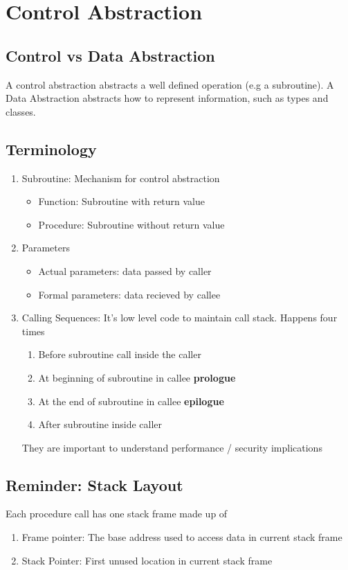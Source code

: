 \documentclass{article}
\begin{document}
\section{Control Abstraction}
\subsection{Control vs Data Abstraction}
A control abstraction abstracts a well defined operation (e.g a subroutine). A Data Abstraction abstracts how to represent information, such as types and classes.

\subsection{Terminology}
\begin{enumerate}
  \item Subroutine: Mechanism for control abstraction
  \begin{itemize}
    \item Function: Subroutine with return value
    \item Procedure: Subroutine without return value
  \end{itemize}
  \item Parameters
  \begin{itemize}
    \item Actual parameters: data passed by caller
    \item Formal parameters: data recieved by callee
  \end{itemize}
  \item Calling Sequences: It's low level code to maintain call stack. Happens four times
  \begin{enumerate}
    \item Before subroutine call inside the caller
    \item At beginning of subroutine in callee \textbf{prologue}
    \item At the end of subroutine in callee \textbf{epilogue}
    \item After subroutine inside caller
  \end{enumerate}
  They are important to understand performance / security implications
\end{enumerate}
\subsection{Reminder: Stack Layout}
Each procedure call has one stack frame made up of 
\begin{enumerate}
  \item Frame pointer: The base address used to access data in current stack frame
  \item Stack Pointer: First unused location in current stack frame
\end{enumerate}
\end{document}
